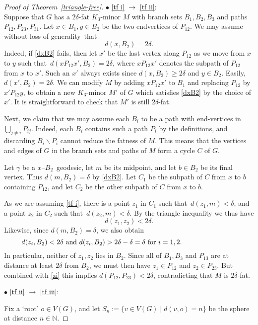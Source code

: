 \documentclass[a4paper]{article}
\newcommand{\N}{\ensuremath{\mathbb N}}
\newcommand{\sm}{\backslash}
\newcommand{\Tr}[1]{Theorem~\ref{#1}}
\newcommand{\st}{such that}
\newcommand{\obda}{without loss of generality}
\newcommand{\labequ}[2]{ \begin{equation} \label{#1} #2 \end{equation} }
\newcommand{\labtequ}[2]{\begin{equation} \label{#1} 	\begin{minipage}[c]{0.9\textwidth}  #2 \end{minipage} \ignorespacesafterend \end{equation} }
\begin{document}
\begin{proof}[Proof of \Tr{triangle-free}]
\medskip
$\bullet$ \ref{tf i} $\to$ \ref{tf ii}:\\
Suppose that $G$ has a $2\delta$-fat $K_3$-minor $M$ with branch sets $B_1,B_2,B_3$ and paths $P_{12},P_{23}, P_{31}$. Let $x\in B_1, y\in B_2$ be the two endvertices of $P_{12}$. We may assume \obda\ that 
\labequ{dxB2}{d(x,B_2)=2\delta.}
Indeed, if \eqref{dxB2} fails, then let $x'$ be the last vertex along $P_{12}$ as we move from $x$ to $y$ \st\ $d(xP_{12}x',B_2)=2\delta$, where $xP_{12}x'$ denotes the subpath of $P_{12}$ from $x$ to $x'$. Such an $x'$ always exists since $d(x,B_2)\geq 2\delta$ and $y\in B_2$. Easily, $d(x',B_2)=2\delta$. We can modify $M$ by adding $xP_{12}x'$ to $B_1$ and replacing $P_{12}$ by $x' P_{12}y$, to obtain a new $K_3$-minor $M'$ of $G$ which satisfies \eqref{dxB2} by the choice of $x'$. It is straightforward to check that $M'$ is still $2\delta$-fat. 

Next, we claim that we may assume each $B_i$ to be a path with end-vertices in $\bigcup_{j\neq i} P_{ij}$. Indeed, each $B_i$ contains such a path $P_i$ by the definitions, and discarding $B_i\sm P_i$ cannot reduce the fatness of $M$. This means that the vertices and edges of $G$ in the branch sets and paths of $M$ form a cycle $C$ of $G$.

Let $\gamma$ be a $x$--$B_2$~geodesic,  let $m$ be its midpoint, and let $b\in B_2$ be its final vertex. Thus $d(m,B_2)=\delta$ by  \eqref{dxB2}. Let $C_1$ be the subpath of $C$ from $x$ to $b$ containing $P_{12}$, and let $C_2$ be the other subpath of $C$ from $x$ to $b$.

As we are assuming \ref{tf i}, there is a point $z_1$ in $C_1$ \st\ $d(z_1,m)<\delta$, and a point $z_2$ in $C_2$ \st\ $d(z_2,m)<\delta$. By the triangle inequality we thus have
\labequ{zi}{d(z_1,z_2)<2\delta.}
Likewise, since $d(m,B_2)=\delta$, we also obtain 
\labtequ{ziB2}{$d(z_i,B_2)<2\delta$ and $d(z_i,B_2)>2\delta-\delta=\delta$ for $i=1,2$.}
In particular, neither of $z_1,z_2$ lies in $B_2$. Since all of  $B_1,B_3$ and $P_{13}$ are at distance at least $2\delta$ from $B_2$, we must then have $z_1\in P_{12}$ and $z_2\in P_{23}$. But combined with \eqref{zi} this implies $d(P_{12},P_{23})<2\delta$, contradicting that $M$ is $2\delta$-fat.
\bigskip

$\bullet$ \ref{tf ii} $\to$ \ref{tf iii}:

Fix a `root' $o\in V(G)$, and let $S_n:= \{ v\in V(G) \mid d(v,o)=n \}$ be the sphere at distance $n\in \N$. 


\end{proof}
\end{document}
